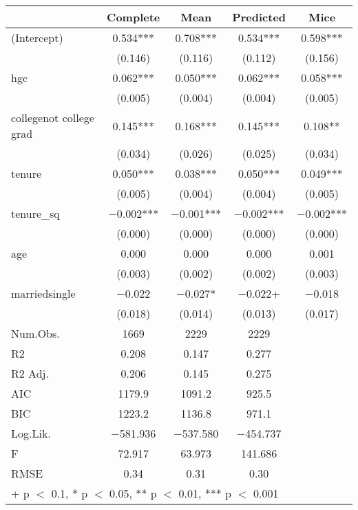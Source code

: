 \begin{table}[H]
\centering
\begin{tabular}[t]{lcccc}
\toprule
  & Complete & Mean & Predicted & Mice\\
\midrule
(Intercept) & \num{0.534}*** & \num{0.708}*** & \num{0.534}*** & \num{0.598}***\\
 & (\num{0.146}) & (\num{0.116}) & (\num{0.112}) & (\num{0.156})\\
hgc & \num{0.062}*** & \num{0.050}*** & \num{0.062}*** & \num{0.058}***\\
 & (\num{0.005}) & (\num{0.004}) & (\num{0.004}) & \vphantom{1} (\num{0.005})\\
collegenot college grad & \num{0.145}*** & \num{0.168}*** & \num{0.145}*** & \num{0.108}**\\
 & (\num{0.034}) & (\num{0.026}) & (\num{0.025}) & (\num{0.034})\\
tenure & \num{0.050}*** & \num{0.038}*** & \num{0.050}*** & \num{0.049}***\\
 & (\num{0.005}) & (\num{0.004}) & (\num{0.004}) & (\num{0.005})\\
tenure\_sq & \num{-0.002}*** & \num{-0.001}*** & \num{-0.002}*** & \num{-0.002}***\\
 & (\num{0.000}) & (\num{0.000}) & (\num{0.000}) & (\num{0.000})\\
age & \num{0.000} & \num{0.000} & \num{0.000} & \num{0.001}\\
 & (\num{0.003}) & (\num{0.002}) & (\num{0.002}) & (\num{0.003})\\
marriedsingle & \num{-0.022} & \num{-0.027}* & \num{-0.022}+ & \num{-0.018}\\
 & (\num{0.018}) & (\num{0.014}) & (\num{0.013}) & (\num{0.017})\\
\midrule
Num.Obs. & \num{1669} & \num{2229} & \num{2229} & \\
R2 & \num{0.208} & \num{0.147} & \num{0.277} & \\
R2 Adj. & \num{0.206} & \num{0.145} & \num{0.275} & \\
AIC & \num{1179.9} & \num{1091.2} & \num{925.5} & \\
BIC & \num{1223.2} & \num{1136.8} & \num{971.1} & \\
Log.Lik. & \num{-581.936} & \num{-537.580} & \num{-454.737} & \\
F & \num{72.917} & \num{63.973} & \num{141.686} & \\
RMSE & \num{0.34} & \num{0.31} & \num{0.30} & \\
\bottomrule
\multicolumn{5}{l}{\rule{0pt}{1em}+ p $<$ 0.1, * p $<$ 0.05, ** p $<$ 0.01, *** p $<$ 0.001}\\
\end{tabular}
\end{table}
